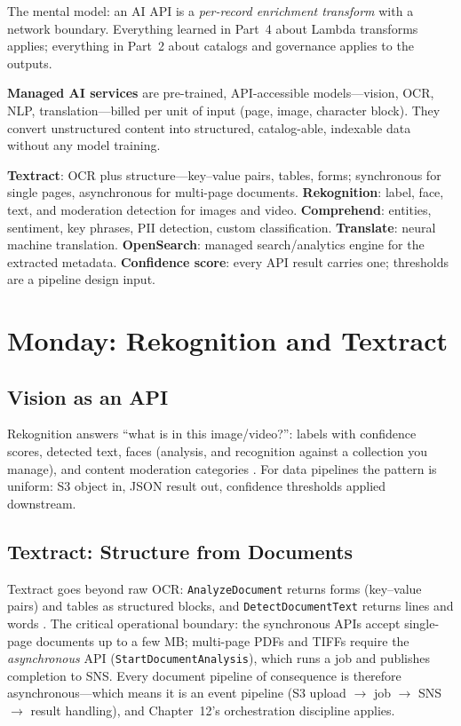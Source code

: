 The mental model: an AI API is a \emph{per-record enrichment transform} with a network boundary. Everything learned in Part~4 about Lambda transforms applies; everything in Part~2 about catalogs and governance applies to the outputs.

\begin{definitionbox}
\textbf{Managed AI services} are pre-trained, API-accessible models---vision, OCR, NLP, translation---billed per unit of input (page, image, character block). They convert unstructured content into structured, catalog-able, indexable data without any model training.
\end{definitionbox}

\begin{keyterms}
\textbf{Textract}: OCR plus structure---key--value pairs, tables, forms; synchronous for single pages, asynchronous for multi-page documents. \textbf{Rekognition}: label, face, text, and moderation detection for images and video. \textbf{Comprehend}: entities, sentiment, key phrases, PII detection, custom classification. \textbf{Translate}: neural machine translation. \textbf{OpenSearch}: managed search/analytics engine for the extracted metadata. \textbf{Confidence score}: every API result carries one; thresholds are a pipeline design input.
\end{keyterms}

\section{Monday: Rekognition and Textract}
\subsection{Vision as an API}
Rekognition answers ``what is in this image/video?'': labels with confidence scores, detected text, faces (analysis, and recognition against a collection you manage), and content moderation categories \cite{awsRekognitionDocs}. For data pipelines the pattern is uniform: S3 object in, JSON result out, confidence thresholds applied downstream.

\subsection{Textract: Structure from Documents}
Textract goes beyond raw OCR: \texttt{AnalyzeDocument} returns forms (key--value pairs) and tables as structured blocks, and \texttt{DetectDocumentText} returns lines and words \cite{awsTextractDocs}. The critical operational boundary: the synchronous APIs accept single-page documents up to a few MB; multi-page PDFs and TIFFs require the \emph{asynchronous} API (\texttt{StartDocumentAnalysis}), which runs a job and publishes completion to SNS. Every document pipeline of consequence is therefore asynchronous---which means it is an event pipeline (S3 upload $\rightarrow$ job $\rightarrow$ SNS $\rightarrow$ result handling), and Chapter~12's orchestration discipline applies.

